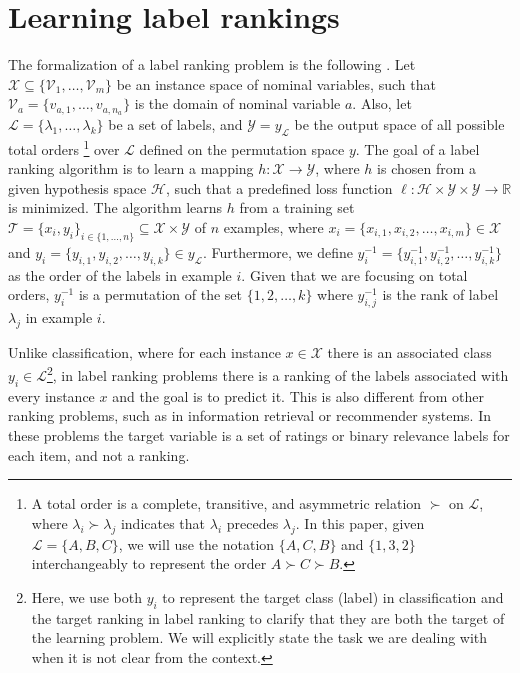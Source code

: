  \section{Learning label rankings}
 \label{ch2-sec:learning}

The formalization of a label ranking problem is the following \citep{vembu2009}. Let $\mathcal{X} \subseteq \{\mathcal{V}_1,\ldots,\mathcal{V}_m\}$ be an instance space of nominal variables, such that $\mathcal{V}_a=\{v_{a,1}, \ldots, v_{a,n_a}\}$ is the domain of nominal variable $a$.  Also, let $\mathcal{L} = \{\lambda_1,\ldots,\lambda_k\}$ be a set of labels, and $\mathcal{Y} = y_{\mathcal{L}}$ be the output space of all possible total orders%
\footnote[1]{A total order is a complete, transitive, and asymmetric relation $\succ$ on $\mathcal{L}$, where $\lambda_i \succ \lambda_j$ indicates that $\lambda_i$ precedes $\lambda_j$. In this paper, given $\mathcal{L}=\{A,B,C\}$, we will use the notation $\{A,C,B\}$ and $\{1,3,2\}$ interchangeably to represent the order $A \succ C \succ B$.} over $\mathcal{L}$ defined on the permutation space $y$. The goal of a label ranking algorithm is to learn a mapping $h: \mathcal{X} \rightarrow \mathcal{Y}$, where $h$ is chosen from a given hypothesis space $\mathcal{H}$, such that a predefined loss function $\ell: \mathcal{H} \times \mathcal{Y} \times \mathcal{Y} \rightarrow \mathbb{R}$ is minimized. The algorithm learns $h$ from a training set $\mathcal{T}=\{x_i,y_i\}_{i \in \{1, \ldots, n\}} \subseteq \mathcal{X} \times \mathcal{Y}$ of $n$ examples, where $x_i = \{x_{i,1}, x_{i,2}, \ldots, x_{i,m} \} \in \mathcal{X}$ and $ y_i = \{y_{i,1}, y_{i,2}, \dots, y_{i,k}\} \in y_{\mathcal{L}}$. Furthermore, we define $y_i^{-1} = \{y_{i,1}^{-1}, y_{i,2}^{-1}, \ldots, y_{i,k}^{-1}\}$ as the order of the labels in example $i$. Given that we are focusing on total orders, $y_i^{-1}$ is a permutation of the set $\{1, 2, \ldots, k\}$ where $y_{i,j}^{-1}$ is the rank of label $\lambda_j$ in example $i$.

Unlike classification, where for each instance $x \in \mathcal{X}$ there is an associated class $y_i \in \mathcal{L}$\footnote[2]{Here, we use both $y_i$ to represent the target class (label) in classification and the target ranking in label ranking to clarify that they are both the target of the learning problem. We will explicitly state the task we are dealing with when it is not clear from the context.}, in label ranking problems there is a ranking of the labels associated with every instance $x$ and the goal is to predict it. This is also different from other ranking problems, such as in information retrieval or recommender systems. In these problems the target variable is a set of ratings or binary relevance labels for each item, and not a ranking.

